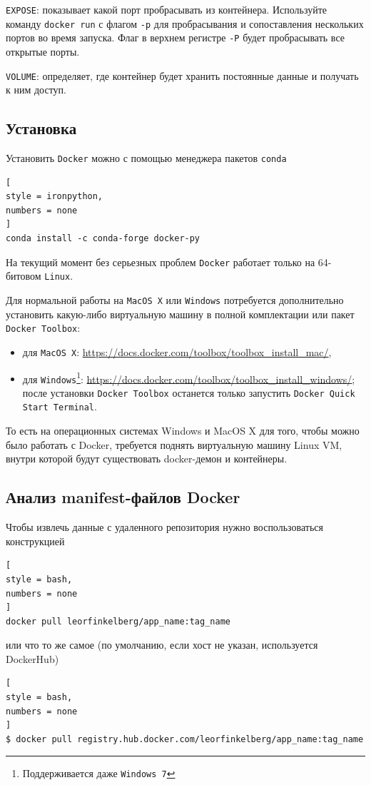 \documentclass[%
	11pt,
	a4paper,
	utf8,
		]{article}
\begin{document}
\texttt{EXPOSE}: показывает какой порт пробрасывать из контейнера. Используйте команду \texttt{docker run} с флагом \verb|-p| для пробрасывания и сопоставления нескольких портов во время запуска. Флаг в верхнем регистре \verb|-P| будет пробрасывать все открытые порты.

\texttt{VOLUME}: определяет, где контейнер будет хранить постоянные данные и получать к ним доступ.

\subsection{Установка}

Установить \texttt{Docker} можно с помощью менеджера пакетов \texttt{conda}

\begin{lstlisting}[
style = ironpython,
numbers = none
]
conda install -c conda-forge docker-py
\end{lstlisting}

На текущий момент без серьезных проблем \texttt{Docker} работает только на 64-битовом \texttt{Linux}.

Для нормальной работы на \texttt{MacOS X} или \texttt{Windows} потребуется дополнительно установить какую-либо виртуальную машину в полной комплектации или пакет \texttt{Docker Toolbox}:

\begin{itemize}
	\item для \texttt{MacOS X}: \url{https://docs.docker.com/toolbox/toolbox_install_mac/},
	
	\item для \texttt{Windows}\footnote{Поддерживается даже \texttt{Windows 7}}: \url{https://docs.docker.com/toolbox/toolbox_install_windows/}; после установки \texttt{Docker Toolbox} останется только запустить \texttt{Docker Quick Start Terminal}.
\end{itemize}

То есть на операционных системах Windows и MacOS X для того, чтобы можно было работать с Docker, требуется поднять виртуальную машину Linux VM, внутри которой будут существовать docker-демон и контейнеры.

\subsection{Анализ manifest-файлов Docker}

Чтобы извлечь данные с удаленного репозитория нужно воспользоваться конструкцией
\begin{lstlisting}[
style = bash,
numbers = none
]
docker pull leorfinkelberg/app_name:tag_name
\end{lstlisting}
или что то же самое (по умолчанию, если хост не указан, используется DockerHub)
\begin{lstlisting}[
style = bash,
numbers = none
]
$ docker pull registry.hub.docker.com/leorfinkelberg/app_name:tag_name
\end{lstlisting}
\end{document}
